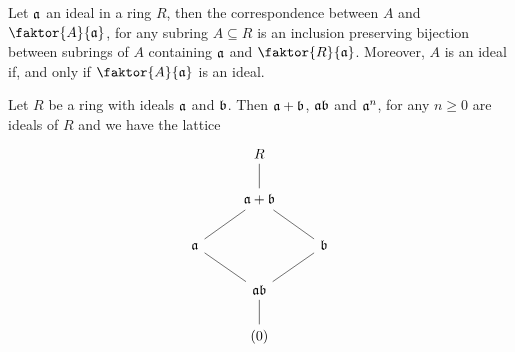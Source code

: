 \begin{theorem}\label{1.3.7}
    Let $\af$ an ideal in a ring $R$, then the correspondence between  $A$ and
    $\faktor{A}{\af}$, for any subring $A \subseteq R$ is an inclusion preserving
    bijection between subrings of $A$ containing  $\af$ and  $\faktor{R}{\af}$.
    Moreover, $A$ is an ideal if, and only if  $\faktor{A}{\af}$ is an ideal.
\end{theorem}

\begin{lemma}\label{1.3.8}
    Let $R$ be a ring with ideals  $\af$ and $\bf$. Then  $\af+\bf$, $\af\bf$ and
    $\af^n$, for any  $n \geq 0$ are ideals of  $R$ and we have the lattice
    \[\begin{tikzcd}
	& R \\
	& {\af+\bf} \\
	\af && \bf \\
	& \af\bf \\
	& {(0)}
	\arrow[no head, from=1-2, to=2-2]
	\arrow[no head, from=2-2, to=3-1]
	\arrow[no head, from=3-1, to=4-2]
	\arrow[no head, from=4-2, to=3-3]
	\arrow[no head, from=3-3, to=2-2]
	\arrow[no head, from=4-2, to=5-2]
    \end{tikzcd}\]
\end{lemma}
